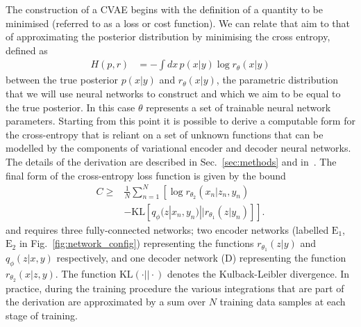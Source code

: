 \documentclass[%
showpacs,
 amsmath,amssymb,
 aps,
 twocolumn,
 prl,
 reprint,
floatfix,
]{revtex4-1}
\begin{document}
%
%
The construction of a \ac{CVAE} begins with the definition of a quantity to be
minimised (referred to as a loss or cost function). We can relate that aim to
that of approximating the posterior distribution by minimising the cross
entropy, defined as
%
\begin{align}\label{eq:cross_ent} H(p,r) &= -\int dx\, p(x|y) \log
r_{\theta}(x|y) \end{align}
%
between the true posterior $p(x|y)$ and $r_{\theta}(x|y)$, the parametric
distribution that we will use neural networks to construct and which we aim to
be equal to the true posterior. In this case $\theta$ represents a set of
trainable neural network parameters. Starting from this point it is possible to
derive a computable form for the cross-entropy that is reliant on a set of
unknown functions that can be modelled by the components of variational encoder
and decoder neural networks. The details of the derivation are described in
Sec.~\ref{sec:methods} and in~\cite{1904.06264}. The final form of the
cross-entropy loss function is given by the bound
%
\begin{align}\label{eq:cost3}
C \geq & \frac{1}{N}\sum_{n=1}^{N}\left[\log
r_{\theta_{2}}(x_{n}|z_{n},y_{n})\right.\nonumber\\
&\left.-\text{KL}\left[q_{\phi}(z|x_{n},y_{n})||r_{\theta_{1}}(z|y_{n})\right]\right].
\end{align}
%
and requires three fully-connected networks; two encoder networks (labelled
$\textrm{E}_1$, $\textrm{E}_2$ in Fig.~\ref{fig:network_config}) representing
the functions $r_{\theta_{1}}(z|y)$ and $q_{\phi}(z|x,y)$ respectively, and one
decoder network (D) representing the function $r_{\theta_{2}}(x|z,y)$. The
function $\text{KL}(\cdot||\cdot)$ denotes the Kulback-Leibler divergence. In
practice, during the training procedure the various integrations that are part
of the derivation are approximated by a sum over $N$ training data samples at
each stage of training.
\end{document}
